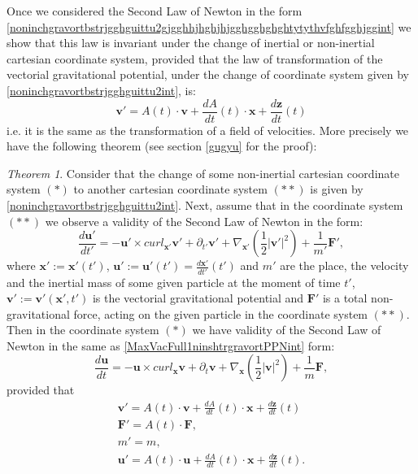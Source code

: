 \documentclass{article}
\newtheorem{theorem}{Theorem}[section]
\theoremstyle{definition}
\theoremstyle{remark}
\renewcommand{\vec}[1]{\mathbf{#1}}
\newcommand{\er}{\eqref}
\newcommand{\er}{\eqref}
\newtheorem{theorem}{Theorem}
\begin{document}
Once we considered the Second Law of Newton in the form
\er{noninchgravortbstrjgghguittu2gjgghhjhghjhjgghgghghghtytythvfghfgghjggint}
we show that this law is invariant under the change of inertial or
non-inertial cartesian coordinate system, provided that the law of
transformation of the vectorial gravitational potential, under the
change of coordinate system given by
\er{noninchgravortbstrjgghguittu2int}, is:
\begin{equation}\label{MaxVacFull1ninshtrgravortPPNintspd}\vec v'=A(t)\cdot \vec
v+\frac{dA}{dt}(t)\cdot\vec x+\frac{d\vec z}{dt}(t)
\end{equation}
i.e. it is the same as the transformation of a field of velocities.
More precisely we have the following theorem (see section
\ref{gugyu} for the proof):
\begin{theorem}\label{gjghghgghgint}
Consider that the change of some non-inertial cartesian coordinate
system $(*)$ to another cartesian coordinate system $(**)$ is given
by \er{noninchgravortbstrjgghguittu2int}. Next, assume that in the
coordinate system $(**)$ we observe a validity of the Second Law of
Newton in the form:
\begin{equation}\label{MaxVacFull1ninshtrgravortPPNint}
\frac{d\vec u'}{dt'}=-\vec u'\times curl_{\vec x'}\vec
v'+\partial_{t'}\vec v'+\nabla_{\vec x'}\left(\frac{1}{2}|\vec
v'|^2\right)+\frac{1}{m'}\vec F',
\end{equation}
where $\vec x':=\vec x'(t')$, $\vec u':=\vec u'(t')=\frac{d\vec
x'}{dt'}(t')$ and $m'$ are the place, the velocity and the inertial
mass of some given particle at the moment of time $t'$, $\vec
v':=\vec v'(\vec x',t')$ is the vectorial gravitational potential
and $\vec F'$ is a total non-gravitational force, acting on the
given particle in the coordinate system $(**)$. Then in the
coordinate system $(*)$ we have validity of the Second Law of Newton
in the same as \er{MaxVacFull1ninshtrgravortPPNint} form:
\begin{equation}\label{MaxVacFull1ninshtrgravortjhhjPPNjffjfint}
\frac{d\vec u}{dt}=-\vec u\times curl_{\vec x}\vec
v+\partial_{t}\vec v+\nabla_{\vec x}\left(\frac{1}{2}|\vec
v|^2\right)+\frac{1}{m}\vec F,
\end{equation}
provided that
\begin{align}
\label{NoIn5gravortPPN11int}\vec v'=A(t)\cdot \vec
v+\frac{dA}{dt}(t)\cdot\vec x+\frac{d\vec z}{dt}(t)\\
\label{NoIn1gravortPPN11int}\vec F'=A(t)\cdot\vec F,\\
\label{NoIn2gravortPPN11int}m'=m,\\
\label{NoIn3gravortPPN11int}\vec u'=A(t)\cdot \vec
u+\frac{dA}{dt}(t)\cdot\vec x+\frac{d\vec z}{dt}(t).
\end{align}
\end{theorem}
\end{document}
